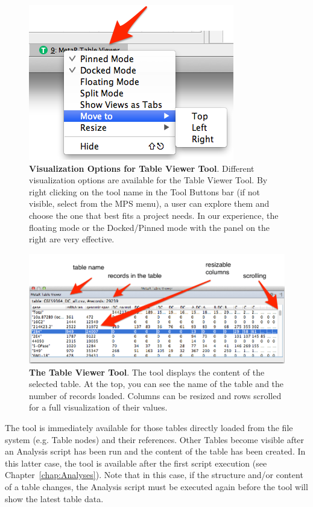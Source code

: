 \begin{figure}
  \centering
  \includegraphics[width=\figWidthTiny]{figures/ToolVisualizationOptions.png}
\caption[Visualization Options for Table Viewer Tool]{\textbf{Visualization Options for Table Viewer Tool}. Different visualization options are available for the Table Viewer Tool. By right clicking on the tool name in the Tool Buttons bar (if not visible, select   from the MPS menu), a user can explore them and choose the one that best fits a project needs. In our experience, the floating mode or the Docked/Pinned mode with the panel on the right are very effective.}
\label{fig:ToolVisualizationOptions}
\end{figure}

\begin{figure}[h!tbp]
  \centering
  \includegraphics[width=\figWidthWide]{figures/TableViewerToolDetails.png}
\caption[The Table Viewer Tool]{\textbf{The Table Viewer Tool}. The tool displays the content of the selected table. At the top, you can see the name of the table and the number of records loaded. Columns can be resized and rows scrolled for a full visualization of their values.}
\label{fig:ToolVisualizationOptions}
\end{figure}

The tool is immediately available for those tables directly loaded from the file system (e.g. Table nodes) and their references. Other Tables become visible after an Analysis script has been run and the content of the table has been created. In this latter case, the tool is available after the first script execution (see Chapter~\ref{chap:Analyses}). Note that in this case, if the structure and/or content of a table changes, the Analysis script must be executed again before the tool will show the latest table data.


